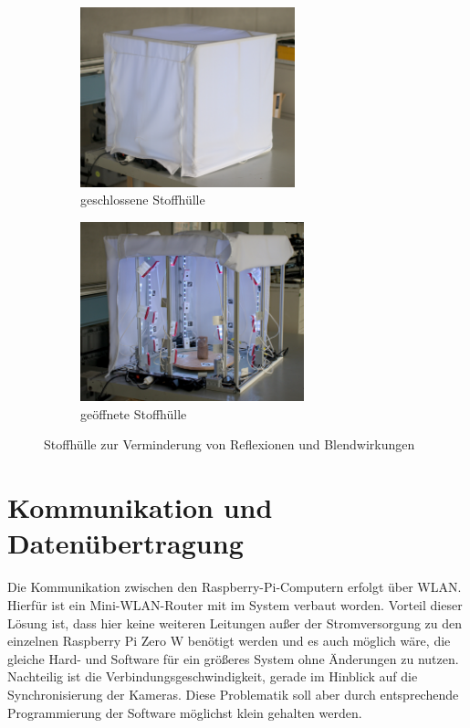 \documentclass[./00PhotoBox.tex]{subfiles}
\begin{document}
\begin{figure}
    \centering
    \begin{subfigure}{0.45\textwidth}
        \includegraphics[height=5.2cm]{./img/3_aufbau/stoffhuelle.jpg}
        \centering
        \caption{geschlossene Stoffhülle}
        \label{img:stoffhuelle}
    \end{subfigure}
    \begin{subfigure}{0.45\textwidth}
        \includegraphics[height=5.2cm]{./img/3_aufbau/stoffhuelle_offen.jpg}
        \centering
        \caption{geöffnete Stoffhülle}
        \label{img:stoffhuelle_offen}
    \end{subfigure}
    \caption{Stoffhülle zur Verminderung von Reflexionen und Blendwirkungen}
\end{figure}

\section{Kommunikation und Datenübertragung}
Die Kommunikation zwischen den Raspberry-Pi-Computern erfolgt über WLAN. Hierfür ist ein Mini-WLAN-Router mit im System verbaut worden. Vorteil dieser Lösung ist, dass hier keine weiteren Leitungen außer der Stromversorgung zu den einzelnen Raspberry Pi Zero W benötigt werden und es auch möglich wäre, die gleiche Hard- und Software für ein größeres System ohne Änderungen zu nutzen. Nachteilig ist die Verbindungsgeschwindigkeit, gerade im Hinblick auf die Synchronisierung der Kameras. Diese Problematik soll aber durch entsprechende Programmierung der Software möglichst klein gehalten werden.
\end{document}
